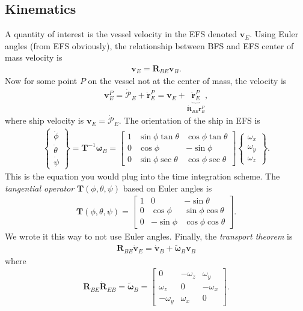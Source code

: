 \documentclass[10pt]{article}
\newcommand{\mbf}[1]{\mathbf{#1}}
\newcommand{\mcal}[1]{\mathcal{#1}} %
\newcommand{\be}{\begin{eqnarray}}
\newcommand{\ee}{\end{eqnarray}}
\newcommand{\ben}{\begin{eqnarray*}}
\newcommand{\een}{\end{eqnarray*}}
\begin{document}
\subsection{Kinematics}

A quantity of interest is the vessel velocity in the EFS denoted $\mbf{v}_E$.
Using Euler angles (from EFS obviously), the relationship between BFS and EFS center of mass velocity is
\ben
\mbf{v}_E = \mbf{R}_{BE} \mbf{v}_B.
\een
% 
Now for some point $P$ on the vessel not at the center of mass, the velocity is
\ben
\mbf{v}_E^P = \dot{\mcal{P}}_E + \dot{\mbf{r}}_E^P = \mbf{v}_E + \underbrace{\dot{\mbf{r}}_E^P}_{
	\dot{\mbf{R}}_{BE} \mbf{r}_B^P
},
\een
% 
where ship velocity is $\mbf{v}_E = \dot{\mcal{P}}_E$.
The orientation of the ship in EFS is
\be
\boxed{
	\left\{\begin{array}{c}
		\dot{\phi}   \\
		\dot{\theta} \\
		\dot{\psi}
	\end{array}\right\}=\mbf{T}^{-1} \boldsymbol{\omega}_B=\left[\begin{array}{ccc}
			1 & \sin \phi \tan \theta & \cos \phi \tan \theta \\
			0 & \cos \phi             & -\sin \phi            \\
			0 & \sin \phi \sec \theta & \cos \phi \sec \theta
		\end{array}\right]\left\{\begin{array}{l}
		\omega_x \\
		\omega_y \\
		\omega_z
	\end{array}\right\}}.
\ee
This is the equation you would plug into the time integration scheme.
The \emph{tangential operator} $\mbf{T}(\phi,\theta,\psi)$ based on Euler angles is
\ben
\mbf{T}(\phi, \theta, \psi)=\left[\begin{array}{ccc}
		1 & 0          & -\sin \theta          \\
		0 & \cos \phi  & \sin \phi \cos \theta \\
		0 & -\sin \phi & \cos \phi \cos \theta
	\end{array}\right].
\een
% 
We wrote it this way to not use Euler angles.
Finally, the \emph{transport theorem} is
\ben
\mbf{R}_{B E} \dot{\mbf{v}}_E=\dot{\mbf{v}}_B+\tilde{\boldsymbol{\omega}}_B \mbf{v}_B
\een
% 
where
% 
\ben
\mbf{R}_{B E} \dot{\mbf{R}}_{E B} = \tilde{\boldsymbol{\omega}}_B=\left[\begin{array}{ccc}
		0         & -\omega_z & \omega_y  \\
		\omega_z  & 0         & -\omega_x \\
		-\omega_y & \omega_x  & 0
	\end{array}\right].
\een
\end{document}
